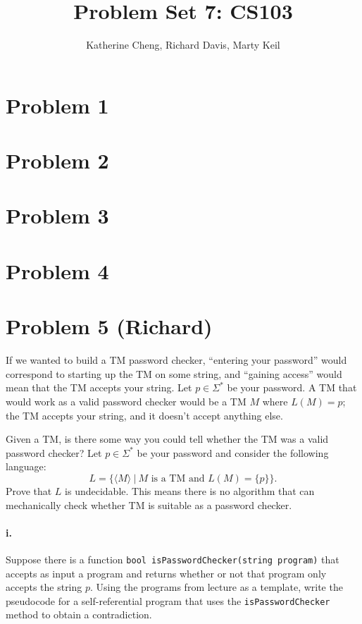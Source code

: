 \documentclass[10pt,letter]{article}
\begin{document}

\title{Problem Set 7: CS103}

\author{Katherine Cheng, Richard Davis, Marty Keil}

 
\maketitle

\section*{Problem 1}
\section*{Problem 2}
\section*{Problem 3}
\section*{Problem 4}
\section*{Problem 5 (Richard)}
If we wanted to build a TM password checker, “entering your password” would correspond to starting up the TM on some string, and “gaining access” would mean that the TM accepts your string. Let $p \in \Sigma^*$ be your password. A TM that would work as a valid password checker would be a TM $M$ where $L(M) = {p}$; the TM accepts your string, and it doesn't accept anything else.

Given a TM, is there some way you could tell whether the TM was a valid password checker? Let $p \in \Sigma^*$ be your password and consider the following language: $$ L = \{ \langle M \rangle \ | \ M \text{ is a TM and } L(M) = \{p\}\}.$$ Prove that $L$ is undecidable. This means there is no algorithm that can mechanically check whether TM is suitable as a password checker.

\paragraph{i.} Suppose there is a function \texttt{bool isPasswordChecker(string program)} that accepts as input a program and returns whether or not that program only accepts the string $p$. Using the programs from lecture as a template, write the pseudocode for a self-referential program that uses the \texttt{isPasswordChecker} method to obtain a contradiction. 
\end{document}
